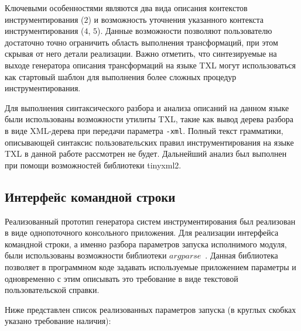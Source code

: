 Ключевыми особенностями являются два вида описания контекстов инструментирования ($2$) и возможность уточнения указанного контекста инструментирования ($4$, $5$).
Данные возможности позволяют пользователю достаточно точно ограничить область выполнения трансформаций, при этом скрывая от него детали реализации.
Важно отметить, что синтезируемые на выходе генератора описания трансформаций на языке TXL могут использоваться как стартовый шаблон для выполнения более сложных процедур инструментирования.

Для выполнения синтаксического разбора и анализа описаний на данном языке были использованы возможности утилиты TXL, такие как вывод дерева разбора в виде XML-дерева при передачи параметра \lstinline{-xml}.
Полный текст грамматики, описывающей синтаксис пользовательских правил инструментирования на языке TXL в данной работе рассмотрен не будет.
Дальнейший анализ был выполнен при помощи возможностей библиотеки tinyxml2.

\subsection{Интерфейс командной строки}

Реализованный прототип генератора систем инструментирования был реализован в виде однопоточного консольного приложения.
Для реализации интерфейса командной строки, а именно разбора параметров запуска исполнимого модуля, были использованы возможности библиотеки $argparse$~\cite{argparse}.
Данная библиотека позволяет в программном коде задавать используемые приложением параметры и одновременно с этим описывать это требование в виде текстовой пользовательской справки.

Ниже представлен список реализованных параметров запуска (в круглых скобках указано требование наличия):

